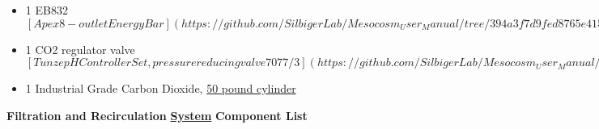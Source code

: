 \documentclass[]{book}
\begin{document}
\begin{itemize}
  1 Base Unit
  \([Apex](https://github.com/SilbigerLab/Mesocosm_User_Manual/tree/394a3f7d9fed8765e4152f9fdd11d00a2ea87a93/Manuals/Apex_Comprehensive_Reference_Manual.pdf) processing unit, 1 unit for 4 tanks\)\\
\item
  1 EB832
  \([Apex 8-outlet EnergyBar](https://github.com/SilbigerLab/Mesocosm_User_Manual/tree/394a3f7d9fed8765e4152f9fdd11d00a2ea87a93/Manuals/EB832_Guide.pdf), 1 unit for 2 tanks\)\\
\item
  1 CO2 regulator valve
  \([Tunze pH Controller Set, pressure reducing valve 7077/3](https://github.com/SilbigerLab/Mesocosm_User_Manual/tree/394a3f7d9fed8765e4152f9fdd11d00a2ea87a93/Manuals/Tunze_CO2_Regulator.pdf)\)\\
\item
  1 Industrial Grade Carbon Dioxide,
  \href{https://www.airgas.com/product/Gases/Industrial-Application-Gases/Carbon-Dioxide---Industrial/p/CD\%2050}{50
  pound cylinder}
\end{itemize}

\textbf{Filtration and Recirculation}
\href{https://github.com/SilbigerLab/Mesocosm_User_Manual/tree/394a3f7d9fed8765e4152f9fdd11d00a2ea87a93/Manuals/Filtration_Skid_Build_Package.pdf}{\textbf{System}}
\textbf{Component List}
\end{document}

